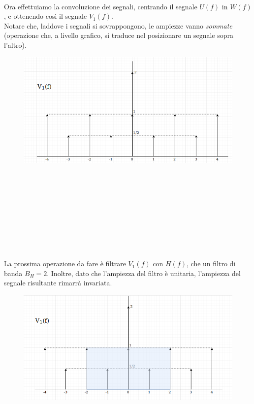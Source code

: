 \documentclass[12pt,a4paper]{article}
\begin{document}
	\\Ora effettuiamo la convoluzione dei segnali, centrando il segnale $U(f)$ in $W(f)$, e ottenendo così il segnale $V_1(f)$.\\Notare che, laddove i segnali si sovrappongono, le ampiezze vanno \textit{sommate} (operazione che, a livello grafico, si traduce nel posizionare un segnale sopra l'altro). 
	\begin{figure}[h!]
		\centering
		\includegraphics[scale=0.4]{./images/fourier55_3.png}
	\end{figure}
    \\ \\ \\ \\ \\ \\ \\ \\ \\La prossima operazione da fare è filtrare $V_1(f)$ con $H(f)$, che un filtro di banda $B_H = 2$. Inoltre, dato che l'ampiezza del filtro è unitaria, l'ampiezza del segnale risultante rimarrà invariata.
    \begin{figure}[h!]
    	\centering
    	\includegraphics[scale=0.4]{./images/fourier55_4.png}
    \end{figure}
\end{document}
